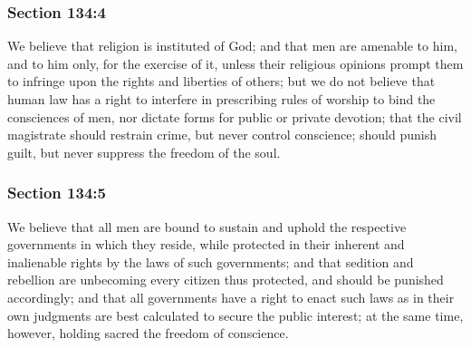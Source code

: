 
	\subsubsection{Section 134:4} %
		\label{DC134-4}

		We believe that religion is instituted of God; and that men are amenable to him, and to him only, for the exercise of it, unless their religious opinions prompt them to infringe upon the rights and liberties of others; but we do not believe that human law has a right to interfere in prescribing rules of worship to bind the consciences of men, nor dictate forms for public or private devotion; that the civil magistrate should restrain crime, but never control conscience; should punish guilt, but never suppress the freedom of the soul.


	\subsubsection{Section 134:5} %
		\label{DC134-5}

		We believe that all men are bound to sustain and uphold the respective governments in which they reside, while protected in their inherent and inalienable rights by the laws of such governments; and that sedition and rebellion are unbecoming every citizen thus protected, and should be punished accordingly; and that all governments have a right to enact such laws as in their own judgments are best calculated to secure the public interest; at the same time, however, holding sacred the freedom of conscience.

